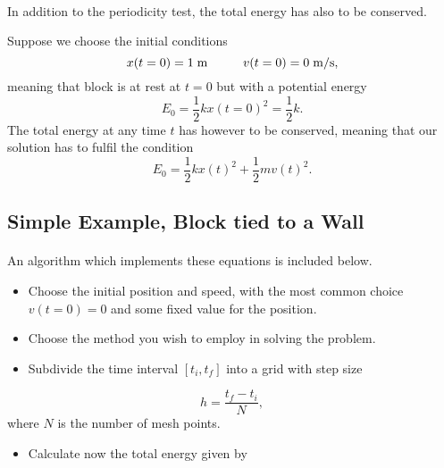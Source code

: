 \documentclass[%
oneside,                 %
final,                   %
10pt]{article}
\begin{document}
\paragraph{}
In addition to the periodicity test, the total energy has also to be conserved. 

Suppose we choose the initial conditions 
\[
     x(t=0)=1\hspace{0.1cm} \mathrm{m}\hspace{1cm} v(t=0)=0\hspace{0.1cm}\mathrm{m/s},
\]
meaning that block is at rest at $t=0$ but with a potential energy
\[
    E_0=\frac{1}{2}kx(t=0)^2=\frac{1}{2}k.
\]
The total energy at any time $t$ has however to be conserved, meaning that our solution has to fulfil the condition
\[
    E_0=\frac{1}{2}kx(t)^2+\frac{1}{2}mv(t)^2.
\]



\subsection*{Simple Example, Block tied to a Wall}

\paragraph{}
An algorithm which implements these equations is included below.
\begin{itemize}
 \item Choose the initial position and speed, with the most common choice $v(t=0)=0$ and some fixed value for the position. 

 \item Choose the method you wish to employ in solving the problem.

 \item Subdivide the time interval $[t_i,t_f] $ into a grid with step size
\end{itemize}

\noindent
       \[
	  h=\frac{t_f-t_i}{N},
      \]
where $N$ is the number of mesh points. 
\begin{itemize}
 \item Calculate now the total energy given by 
\end{itemize}
\end{document}
